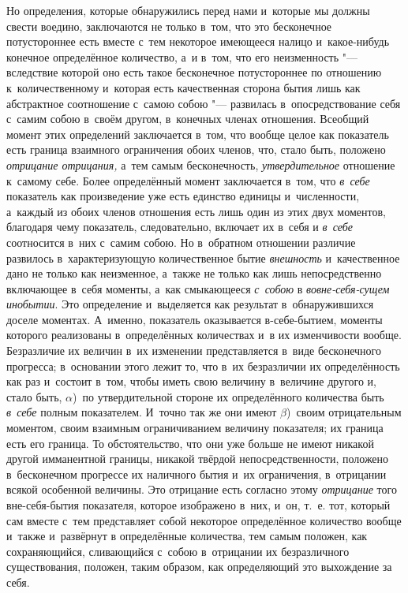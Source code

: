 Но определения, которые обнаружились перед нами и~которые мы должны свести
воедино, заключаются не только в~том, что это бесконечное потустороннее есть
вместе с~тем некоторое имеющееся налицо и~какое-нибудь конечное определённое
количество, а~и в~том, что его неизменность "--- вследствие которой оно есть
такое бесконечное потустороннее по отношению к~количественному и~которая есть
качественная сторона бытия лишь как абстрактное соотношение с~самою собою "---
развилась в~опосредствование себя с~самим собою в~своём другом, в~конечных
членах отношения. Всеобщий момент этих определений заключается в~том, что
вообще целое как показатель есть граница взаимного ограничения обоих членов,
что, стало быть, положено {\em отрицание отрицания,} а~тем самым бесконечность,
{\em утвердительное} отношение к~самому себе. Более определённый момент
заключается в~том, что {\em в~себе} показатель как произведение уже есть
единство единицы и~численности, а~каждый из обоих членов отношения есть лишь
один из этих двух моментов, благодаря чему показатель, следовательно, включает
их в~себя и {\em в~себе} соотносится в~них с~самим собою. Но в~обратном
отношении различие развилось в~характеризующую количественное бытие
{\em внешность} и~качественное дано не только как неизменное, а~также не только
как лишь непосредственно включающее в~себя моменты, а~как смыкающееся
{\em с~собою} в {\em вовне-себя-сущем инобытии}. Это определение и~выделяется
как результат в~обнаружившихся доселе моментах. А~именно, показатель
оказывается в-себе-бытием, моменты которого реализованы в~определённых
количествах и~в их изменчивости вообще. Безразличие их величин в~их изменении
представляется в~виде бесконечного прогресса; в~основании этого лежит то, что
в~их безразличии их определённость как раз и~состоит в~том, чтобы иметь свою
величину в~величине другого и, стало быть, $\alpha$)~по утвердительной стороне
их определённого количества быть {\em в~себе} полным показателем. И~точно так
же они имеют $\beta$)~своим отрицательным моментом, своим взаимным
ограничиванием величину показателя; их граница есть его граница. То
обстоятельство, что они уже больше не имеют никакой другой имманентной границы,
никакой твёрдой непосредственности, положено в~бесконечном
прогрессе их наличного бытия и~их ограничения, в~отрицании всякой особенной
величины. Это отрицание есть согласно этому {\em отрицание} того вне-себя-бытия
показателя, которое изображено в~них, и~он, т.~е. тот, который сам вместе с~тем
представляет собой некоторое определённое количество вообще и~также и~развёрнут
в определённые количества, тем самым положен, как сохраняющийся, сливающийся
с~собою в~отрицании их безразличного существования, положен, таким образом, как
определяющий это выхождение за себя.

